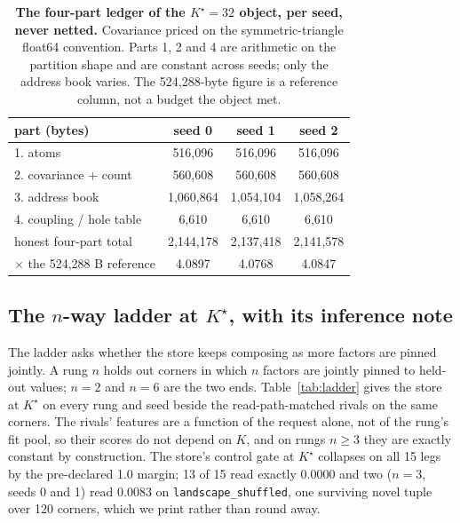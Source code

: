 \documentclass{article} %
\newcommand{\Kstar}{\ensuremath{K^{\star}}}
\begin{document}
\begin{table}[t]
\centering\small
\caption{\textbf{The four-part ledger of the $\Kstar=32$ object, per seed, never netted.}
Covariance priced on the symmetric-triangle float64 convention. Parts 1, 2 and 4 are
arithmetic on the partition shape and are constant across seeds; only the address book varies.
The 524,288-byte figure is a reference column, not a budget the object met.}
\label{tab:ledger-kstar}
\begin{tabular}{lccc}
\toprule
part (bytes) & seed 0 & seed 1 & seed 2 \\
\midrule
1. atoms & 516,096 & 516,096 & 516,096 \\
2. covariance + count & 560,608 & 560,608 & 560,608 \\
3. address book & 1,060,864 & 1,054,104 & 1,058,264 \\
4. coupling / hole table & 6,610 & 6,610 & 6,610 \\
honest four-part total & 2,144,178 & 2,137,418 & 2,141,578 \\
$\times$ the 524,288 B reference & 4.0897 & 4.0768 & 4.0847 \\ %
\bottomrule
\end{tabular}
\end{table}

\subsection{The $n$-way ladder at $\Kstar$, with its inference note}
\label{sec:ladder}

The ladder asks whether the store keeps composing as more factors are pinned jointly. A rung
$n$ holds out corners in which $n$ factors are jointly pinned to held-out values; $n=2$ and
$n=6$ are the two ends. Table~\ref{tab:ladder} gives the store at $\Kstar$ on every rung and
seed beside the read-path-matched rivals on the same corners. The rivals' features are a
function of the request alone, not of the rung's fit pool, so their scores do not depend on
$K$, and on rungs $n\ge3$ they are exactly constant by construction.
The store's control gate at $\Kstar$ collapses on all 15 legs by the pre-declared 1.0 margin;
13 of 15 read exactly 0.0000 and two ($n=3$, seeds 0 and 1) read 0.0083 on
\texttt{landscape\_shuffled}, one surviving novel tuple over 120 corners, which we print
rather than round away. %
\end{document}
